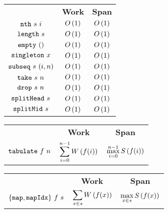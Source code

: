 \begin{costspec}

\begin{tabular}{c|c|c}
& \textbf{Work} & \textbf{Span} \\
$\texttt{nth}~s~i$ & $O\left({1}\right)$ & $O\left({1}\right)$ \\
$\texttt{length}~s$ & $O\left({1}\right)$ & $O\left({1}\right)$ \\
$\texttt{empty}~()$ & $O\left({1}\right)$ & $O\left({1}\right)$ \\
$\texttt{singleton}~x$ & $O\left({1}\right)$ & $O\left({1}\right)$ \\
$\texttt{subseq}~s~(i,n)$ & $O\left({1}\right)$ & $O\left({1}\right)$ \\
$\texttt{take}~s~n$ & $O\left({1}\right)$ & $O\left({1}\right)$ \\
$\texttt{drop}~s~n$ & $O\left({1}\right)$ & $O\left({1}\right)$ \\
$\texttt{splitHead}~s$ & $O\left({1}\right)$ & $O\left({1}\right)$ \\
$\texttt{splitMid}~s$ & $O\left({1}\right)$ & $O\left({1}\right)$
\end{tabular}
\end{costspec}

\begin{costspec}[Tabulate]

\begin{tabular}{c|c|c}
& \textbf{Work} & \textbf{Span} \\
%
$\texttt{tabulate}~f~n$ &
$\displaystyle \sum_{i = 0}^{n-1} W\left({f(i)}\right)$ &
$\displaystyle \max_{i = 0}^{n-1} S\left({f(i)}\right)$ \\
%
\end{tabular}
\end{costspec}



\begin{costspec}[Map]

\begin{tabular}{c|c|c}
& \textbf{Work} & \textbf{Span} \\
%
$\{\texttt{map},\texttt{mapIdx}\}~f~s$ &
$\displaystyle \sum_{x \in s} W\left({f(x)}\right)$ &
$\displaystyle \max_{x \in s} S\left({f(x)}\right)$ \\
%
\end{tabular}
\end{costspec}

